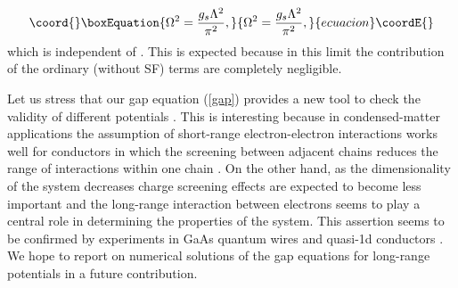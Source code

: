 \documentclass[a4paper,a4paper]{article}
\begin{document}
\begin{equation}\coord{}\boxEquation{
\Omega^2=\frac{g_s\Lambda^2}{\pi^2},
}{
\Omega^2=\frac{g_s\Lambda^2}{\pi^2},
}{ecuacion}\coordE{}\end{equation}
which is independent of \coordHE{}. This is expected because in this limit the contribution
of the ordinary (without SF) terms are completely negligible.

Let us stress that our gap equation (\ref{gap}) provides a new tool to check the
validity of different potentials \cite{Iucci}. This is interesting because in
condensed-matter applications the assumption of short-range electron-electron
interactions works well for conductors in which the screening between adjacent chains
reduces the range of interactions within one chain \cite{Schulz1}. On the other hand,
as the dimensionality of the system decreases charge screening effects are expected to
become less important and the long-range interaction between electrons seems to play a
central role in determining the properties of the system. This assertion seems to be
confirmed by experiments in GaAs quantum wires \cite{quantum wires} and quasi-1d
conductors \cite{quasi-exp}. We hope to report on numerical solutions of the gap
equations for long-range potentials in a future contribution.


\end{document}
